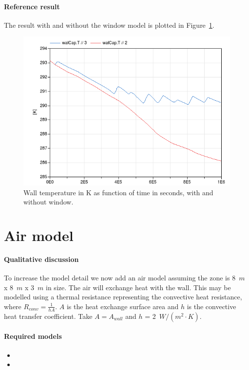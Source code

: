 \documentclass[10pt,a4paper]{article}
\begin{document}
\paragraph{Reference result}
The result with and without the window model
is plotted in Figure~\ref{fig:res2}.

\begin{figure}
\centering
\includegraphics[scale=0.6]{result2.png}
\caption{Wall temperature in K as function of time in seconds,
with and without window.}
\label{fig:res2}
\end{figure}


\section{Air model}
\paragraph{Qualitative discussion}
To increase the model detail we now add
an air model assuming the zone is 8~$m$ x 8~$m$ x 3~$m$ in size.
The air will exchange heat with the wall.
This may be modelled using a thermal resistance representing the convective heat resistance,
where $R_{conv}=\frac{1}{hA}$. $A$ is the heat exchange 
surface area and $h$ is the convective heat transfer coefficient. Take $A = A_{wall}$ and $h$ = 2~${W/(m^2\cdot K)}$.


\paragraph{Required models}
\begin{itemize}
\item {}
\item {}
\end{itemize}
\end{document}
